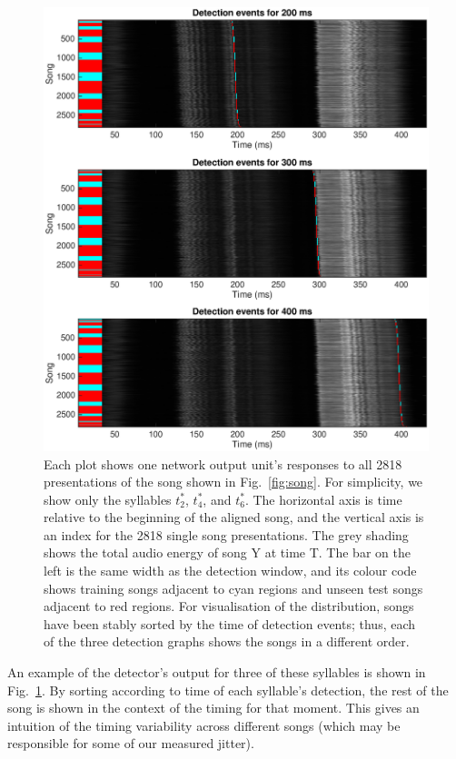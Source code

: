 \documentclass[10pt,letterpaper]{article}
\newcommand\fig[1]{Fig.~\ref{#1}}
\begin{document}
\begin{figure}
  \includegraphics[width=\textwidth]{detection_raster}
  \caption{Each plot shows one network output unit's responses to all
    2818 presentations of the song shown in \fig{fig:song}.  For
    simplicity, we show only the syllables $t^*_2$, $t^*_4$, and $t^*_6$. The
    horizontal axis is time relative to the beginning of the aligned
    song, and the vertical axis is an index for the 2818 single song
    presentations. The grey shading shows the total audio energy of
    song Y at time T. The bar on the left is the same width as the
    detection window, and its colour code shows training songs
    adjacent to cyan regions and unseen test songs adjacent to red
    regions. For visualisation of the distribution, songs have been
    stably sorted by the time of detection events; thus, each of the
    three detection graphs shows the songs in a different order.}
  \label{fig:detection_raster}
\end{figure}

An example of the detector's output for three of these syllables is shown in \fig{fig:detection_raster}.   By sorting according to time of each syllable's detection, the rest of the song is shown in the context of the timing for that moment.  This gives an intuition of the timing variability across different songs (which may be responsible for some of our measured jitter).
\end{document}

